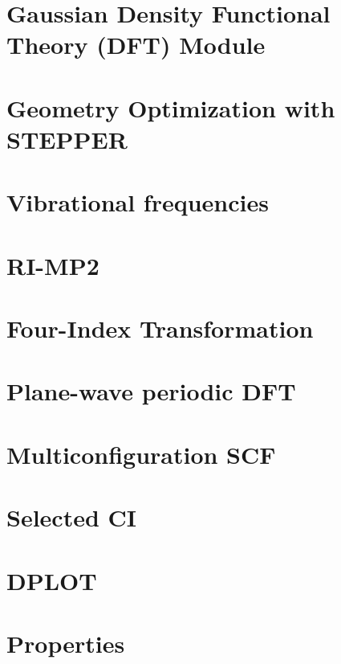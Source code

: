 \section{Gaussian Density Functional Theory (DFT) Module}


\section{Geometry Optimization with STEPPER}

\section{Vibrational frequencies}


\section{RI-MP2}


\section{Four-Index Transformation} 


\section{Plane-wave periodic DFT}


\section{Multiconfiguration SCF}


\section{Selected CI}




\section{DPLOT}


\section{Properties}


